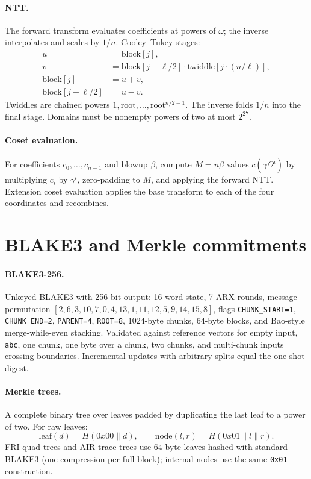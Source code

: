 \documentclass[11pt,a4paper]{article}
\begin{document}
\paragraph{NTT.} The forward transform evaluates coefficients at powers of
$\omega$; the inverse interpolates and scales by $1/n$. Cooley--Tukey stages:
\[
\begin{aligned}
u&=\mathrm{block}[j],\\
v&=\mathrm{block}[j+\ell/2]\cdot\mathrm{twiddle}[j\cdot(n/\ell)],\\
\mathrm{block}[j]&=u+v,\\
\mathrm{block}[j+\ell/2]&=u-v.
\end{aligned}
\]
Twiddles are chained powers $1,\mathrm{root},\dots,\mathrm{root}^{n/2-1}$.
The inverse folds $1/n$ into the final stage. Domains must be nonempty powers
of two at most $2^{27}$.

\paragraph{Coset evaluation.} For coefficients $c_0,\dots,c_{n-1}$ and blowup
$\beta$, compute $M=n\beta$ values $c(\gamma\Omega^i)$ by multiplying $c_i$
by $\gamma^i$, zero-padding to $M$, and applying the forward NTT. Extension
coset evaluation applies the base transform to each of the four coordinates
and recombines.

\section{BLAKE3 and Merkle commitments}

\paragraph{BLAKE3-256.} Unkeyed BLAKE3 with 256-bit output: 16-word state,
7 ARX rounds, message permutation
$[2,6,3,10,7,0,4,13,1,11,12,5,9,14,15,8]$, flags
\texttt{CHUNK\_START=1}, \texttt{CHUNK\_END=2}, \texttt{PARENT=4},
\texttt{ROOT=8}, 1024-byte chunks, 64-byte blocks, and Bao-style
merge-while-even stacking. Validated against reference vectors for empty
input, \texttt{abc}, one chunk, one byte over a chunk, two chunks, and
multi-chunk inputs crossing boundaries. Incremental updates with arbitrary
splits equal the one-shot digest.

\paragraph{Merkle trees.} A complete binary tree over leaves padded by
duplicating the last leaf to a power of two. For raw leaves:
\[
\mathrm{leaf}(d)=H(0x00\|d),\qquad
\mathrm{node}(l,r)=H(0x01\|l\|r).
\]
FRI quad trees and AIR trace trees use 64-byte leaves hashed with standard
BLAKE3 (one compression per full block); internal nodes use the same
\texttt{0x01} construction.
\end{document}
